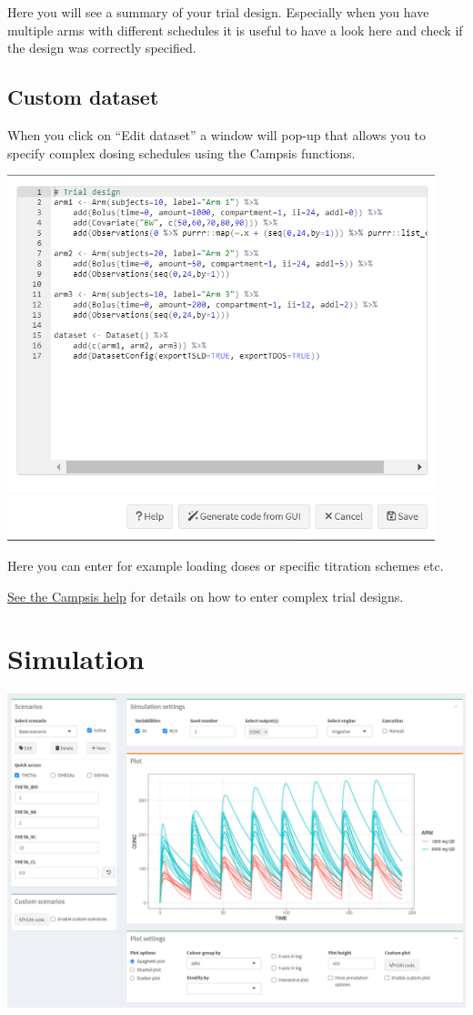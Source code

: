 \documentclass[
]{book}
\begin{document}
Here you will see a summary of your trial design. Especially when you have multiple arms with different schedules it is useful to have a look here and check if the design was correctly specified.

\section{Custom dataset}\label{custom-dataset}

When you click on ``Edit dataset'' a window will pop-up that allows you to specify complex dosing schedules using the Campsis functions.

\includegraphics[width=4.89583in,height=\textheight]{pictures/custom_design.png}

Here you can enter for example loading doses or specific titration schemes etc.

\href{https://calvagone.github.io/campsis.doc/articles/v01_dataset.html}{See the Campsis help} for details on how to enter complex trial designs.

\chapter{Simulation}\label{simulation}

\includegraphics[width=5.84375in,height=\textheight]{pictures/simulation_tab.png}
\end{document}
